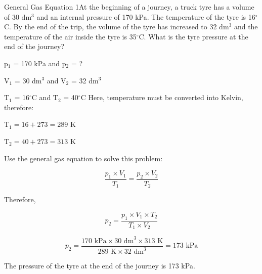 \begin{wex}{General Gas Equation 1}{At the beginning of a journey, a truck tyre has a volume of 30 dm$^{3}$ and an internal pressure of 170 kPa. The temperature of the tyre is 16$^{\circ}$C. By the end of the trip, the volume of the tyre has increased to 32 dm$^{3}$ and the temperature of the air inside the tyre is 35$^{\circ}$C. What is the tyre pressure at the end of the journey?}{

p$_{1}$ = 170 kPa and p$_{2}$ = ?

V$_{1}$ = 30 dm$^{3}$ and V$_{2}$ = 32 dm$^{3}$

T$_{1}$ = 16$^{\circ}$C and T$_{2}$ = 40$^{\circ}$C
Here, temperature must be converted into Kelvin, therefore:

T$_{1} = 16 + 273 = 289$ K

T$_{2} = 40 + 273 = 313$ K

Use the general gas equation to solve this problem:

\begin{equation*}
\frac{p_{1} \times V_{1}}{T_{1}} = \frac{p_{2} \times V_{2}}{T_{2}}
\end{equation*}

Therefore,

\begin{equation*}
p_{2} = \frac{p_{1} \times V_{1} \times T_{2}}{T_{1} \times V_{2}}
\end{equation*}

\begin{equation*}
p_{2} = \frac{170 \text{ kPa} \times 30 \text{ dm}^{3} \times 313 \text{ K}}{289 \text{ K} \times 32 \text{ dm}^{3}} = 173 \text{ kPa}
\end{equation*}

The pressure of the tyre at the end of the journey is 173 kPa.
}
\end{wex}

